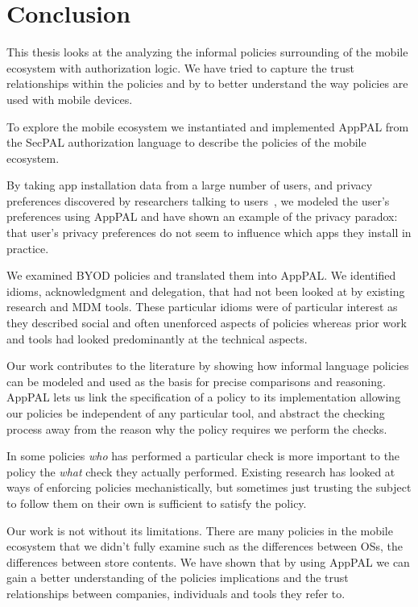 \documentclass[thesis.tex]{subfiles}
\begin{document}
\chapter{Conclusion}

This thesis looks at the analyzing the informal policies surrounding of the
mobile ecosystem with authorization logic. We have tried to capture the trust
relationships within the policies and by to better understand the way policies
are used with mobile devices. 

To explore the mobile ecosystem we instantiated and implemented 
AppPAL from the SecPAL authorization language to describe the policies of
the mobile ecosystem.

By taking app installation data from a large number of users, and privacy
preferences discovered by researchers talking to users~\cite{lin_modeling_2014},
we modeled the user's preferences using AppPAL and have shown an example of the
privacy paradox: that user's privacy preferences do not seem to influence which
apps they install in practice.

We examined BYOD policies and
translated them into AppPAL. We identified idioms,
acknowledgment and delegation, that 
had not been looked at by existing research and \ac{MDM} tools. These particular
idioms were of particular interest as they described social and often unenforced
aspects of policies whereas prior work and tools had looked predominantly at
the technical aspects.

Our work contributes to the literature by showing how informal language policies
can be modeled and used as the basis for precise comparisons and reasoning.
AppPAL lets us link the specification of a policy to its implementation allowing
our policies be independent of any particular tool, and abstract the checking
process away from the reason why the policy requires we perform the checks.

In some policies \emph{who} has performed a
particular check is more important to the policy the \emph{what} check
they actually performed. Existing research has looked at ways of enforcing
policies mechanistically, but sometimes just trusting the subject to follow them
on their own is sufficient to satisfy the policy. 

Our work is not without its limitations. There are many policies in the mobile
ecosystem that we didn't fully examine such as the differences between OSs, the
differences between store contents. We have shown that by using AppPAL we can
gain a better understanding of the policies implications and the trust
relationships between companies, individuals and tools they refer to.
\end{document}
